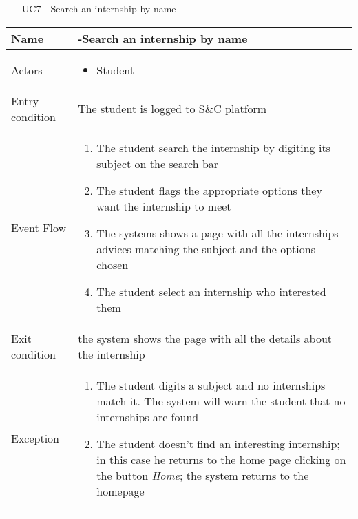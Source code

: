 				\begin{table} [H]
					\centering
					\begin{itemize}
						\item [UC7] - Search an internship by name
					\end{itemize}
					\begin{tabular}{|| P{7.5cm} | P{7.5cm} ||}
						\hline
						Name & -Search an internship by name \\
						\hline
						Actors & \parbox{5cm}{\begin{itemize}
								\item Student
							\end{itemize}
						} \\
						\hline
						Entry condition & The student is logged to S\&C platform  \\
						\hline
						Event Flow & \parbox{5cm}{\begin{enumerate}[label=\alpha]
								\item The student search the internship 
								by digiting its subject on the search 
								bar 
								\item The student flags the appropriate 
								options they want the internship to 
								meet  
								\item The systems shows a page with all 
								the internships advices matching 
								the subject and the options chosen 
								\item The student select an internship who 
								interested them
						\end{enumerate}} \\
						\hline 
						Exit condition &  the system shows the 
						page with all the details about the 
						internship \\
						\hline
						Exception & \parbox{5cm}{\begin{enumerate}[label=\alpha]
								\item The student digits a subject and no 
								internships match it. The system 
								will warn the student that no 
								internships are found 
								\item The student doesn’t find an 
								interesting internship; in this case 
								he returns to the home page 
								clicking on the button \textit{Home}; the 
								system returns to the homepage
								\end{enumerate}} \\
						\hline
					\end{tabular}
				\end{table}
				
